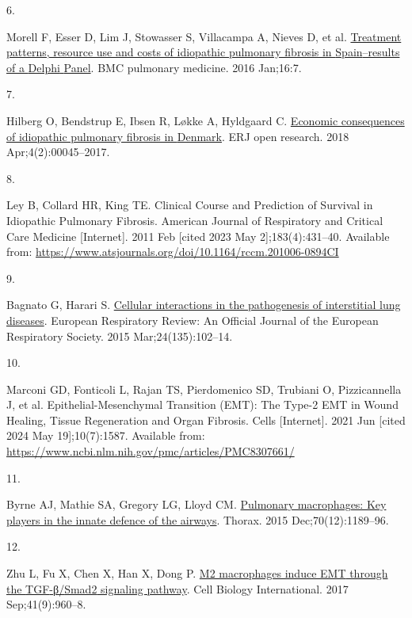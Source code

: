 \documentclass[
]{article}
\newlength{\cslhangindent}
\newlength{\csllabelwidth}
\newenvironment{CSLReferences}[2] %
 {\begin{list}{}{%
  \setlength{\itemindent}{0pt}
  \setlength{\leftmargin}{0pt}
  \setlength{\parsep}{0pt}
  \ifodd #1
   \setlength{\leftmargin}{\cslhangindent}
   \setlength{\itemindent}{-1\cslhangindent}
  \fi
  \setlength{\itemsep}{#2\baselineskip}}}
 {\end{list}}
\newcommand{\CSLLeftMargin}[1]{\parbox[t]{\csllabelwidth}{\strut#1\strut}}
\newcommand{\CSLRightInline}[1]{\parbox[t]{\linewidth - \csllabelwidth}{\strut#1\strut}}
\begin{document}
\begin{CSLReferences}{0}{1}
\CSLLeftMargin{6. }%
\CSLRightInline{Morell F, Esser D, Lim J, Stowasser S, Villacampa A, Nieves D, et al. \href{https://doi.org/10.1186/s12890-016-0168-6}{Treatment patterns, resource use and costs of idiopathic pulmonary fibrosis in {Spain}--results of a {Delphi} {Panel}}. BMC pulmonary medicine. 2016 Jan;16:7. }

\CSLLeftMargin{7. }%
\CSLRightInline{Hilberg O, Bendstrup E, Ibsen R, Løkke A, Hyldgaard C. \href{https://doi.org/10.1183/23120541.00045-2017}{Economic consequences of idiopathic pulmonary fibrosis in {Denmark}}. ERJ open research. 2018 Apr;4(2):00045--2017. }

\CSLLeftMargin{8. }%
\CSLRightInline{Ley B, Collard HR, King TE. Clinical {Course} and {Prediction} of {Survival} in {Idiopathic} {Pulmonary} {Fibrosis}. American Journal of Respiratory and Critical Care Medicine {[}Internet{]}. 2011 Feb {[}cited 2023 May 2{]};183(4):431--40. Available from: \url{https://www.atsjournals.org/doi/10.1164/rccm.201006-0894CI}}

\CSLLeftMargin{9. }%
\CSLRightInline{Bagnato G, Harari S. \href{https://doi.org/10.1183/09059180.00003214}{Cellular interactions in the pathogenesis of interstitial lung diseases}. European Respiratory Review: An Official Journal of the European Respiratory Society. 2015 Mar;24(135):102--14. }

\CSLLeftMargin{10. }%
\CSLRightInline{Marconi GD, Fonticoli L, Rajan TS, Pierdomenico SD, Trubiani O, Pizzicannella J, et al. Epithelial-{Mesenchymal} {Transition} ({EMT}): {The} {Type}-2 {EMT} in {Wound} {Healing}, {Tissue} {Regeneration} and {Organ} {Fibrosis}. Cells {[}Internet{]}. 2021 Jun {[}cited 2024 May 19{]};10(7):1587. Available from: \url{https://www.ncbi.nlm.nih.gov/pmc/articles/PMC8307661/}}

\CSLLeftMargin{11. }%
\CSLRightInline{Byrne AJ, Mathie SA, Gregory LG, Lloyd CM. \href{https://doi.org/10.1136/thoraxjnl-2015-207020}{Pulmonary macrophages: Key players in the innate defence of the airways}. Thorax. 2015 Dec;70(12):1189--96. }

\CSLLeftMargin{12. }%
\CSLRightInline{Zhu L, Fu X, Chen X, Han X, Dong P. \href{https://doi.org/10.1002/cbin.10788}{M2 macrophages induce {EMT} through the {TGF}-β/{Smad2} signaling pathway}. Cell Biology International. 2017 Sep;41(9):960--8. }


\end{CSLReferences}
\end{document}
